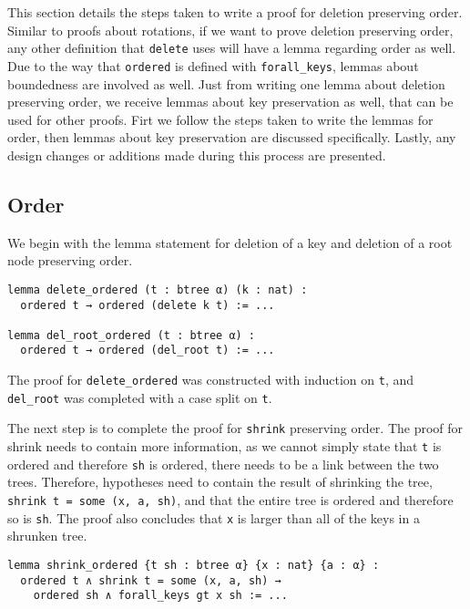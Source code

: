 This section details the steps taken to write a proof for deletion preserving order. Similar to proofs about rotations, if we want to prove deletion preserving order, any other definition that \lstinline{delete} uses will have a lemma regarding order as well. Due to the way that \lstinline{ordered} is defined with \lstinline{forall_keys}, lemmas about boundedness are involved as well. Just from writing one lemma about deletion preserving order, we receive lemmas about key preservation as well, that can be used for other proofs. Firt we follow the steps taken to write the lemmas for order, then lemmas about key preservation are discussed specifically. Lastly, any design changes or additions made during this process are presented.

\subsection*{Order}
 
We begin with the lemma statement for deletion of a key and deletion of a root node preserving order.

\begin{lstlisting}
lemma delete_ordered (t : btree α) (k : nat) :
  ordered t → ordered (delete k t) := ...

lemma del_root_ordered (t : btree α) :
  ordered t → ordered (del_root t) := ...
\end{lstlisting}

The proof for \lstinline{delete_ordered} was constructed with induction on \lstinline{t}, and \lstinline{del_root} was completed with a case split on \lstinline{t}.

The next step is to complete the proof for \lstinline{shrink} preserving order. The proof for shrink needs to contain more information, as we cannot simply state that \lstinline{t} is ordered and therefore \lstinline{sh} is ordered, there needs to be a link between the two trees. Therefore, hypotheses need to contain the result of shrinking the tree, \lstinline{shrink t = some (x, a, sh)}, and that the entire tree is ordered and therefore so is \lstinline{sh}. The proof also concludes that \lstinline{x} is larger than all of the keys in a shrunken tree.

\begin{lstlisting}
lemma shrink_ordered {t sh : btree α} {x : nat} {a : α} :
  ordered t ∧ shrink t = some (x, a, sh) →
    ordered sh ∧ forall_keys gt x sh := ...
\end{lstlisting}

